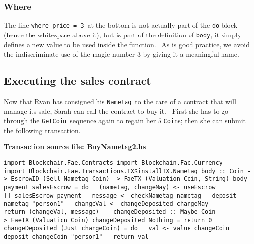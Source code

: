 \documentclass[11pt]{article}
\newcommand{\codeblock}[1]{\begin{mdframed}[
    backgroundcolor=header-color,
    linecolor=header-color,
    innertopmargin=10pt,
    ]{\texttt{#1}}\end{mdframed}}
\begin{document}
\subsubsection{Where}
\vspace{5.5pt}

The line \texttt{where price = 3} at the bottom is not actually part of the \texttt{do}-block (hence the whitespace above it), but is part of the definition of \texttt{body}; it simply defines a new value to be used inside the function.  As is good practice, we avoid the indiscriminate use of the magic number 3 by giving it a meaningful name.

\subsection{Executing the sales contract}
\vspace{5.5pt}

Now that Ryan has consigned his \texttt{Nametag} to the care of a contract that will manage its sale, Sarah can call the contract to buy it.  First she has to go through the \texttt{GetCoin} sequence again to regain her 5 \texttt{Coin}s; then she can submit the following transaction.


\vspace{11pt}

\textbf{Transaction source file: BuyNametag2.hs}

\codeblock{import Blockchain.Fae.Contracts\newline
import Blockchain.Fae.Currency\newline
import Blockchain.Fae.Transactions.TX\$installTX.Nametag\newline
\newline
body :: Coin -\textgreater{} EscrowID (Sell Nametag Coin) -\textgreater{} FaeTX (Valuation Coin, String)\newline
body payment salesEscrow = do\newline
  (nametag, changeMay) \textless{}- useEscrow {[}{]} salesEscrow payment\newline
  message \textless{}- checkNametag nametag\newline
  deposit nametag "person1"\newline
  changeVal \textless{}- changeDeposited changeMay\newline
  return (changeVal, message)\newline
  \newline
changeDeposited :: Maybe Coin -\textgreater{} FaeTX (Valuation Coin)\newline
changeDeposited Nothing = return 0\newline
changeDeposited (Just changeCoin) = do\newline
  val \textless{}- value changeCoin\newline
  deposit changeCoin "person1"\newline
  return val}
\end{document}
